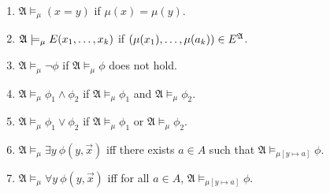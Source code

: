 \begin{samepage}
\begin{enumerate}
%
%
%
\item   $\mathfrak{A} \models_\mu (x = y)$ if 
$ \mu(x) = \mu(y)$.
%
\item  $\mathfrak{A} \models_\mu E(x_1 , \ldots , x_k ) $ if
$ (\mu(x_1), \ldots, \mu(a_k))
\in E^{\mathfrak{A}} $.
%
%
\item   $\mathfrak{A} \models_\mu \neg \phi$ if 
$\mathfrak{A} \models_\mu \phi $ does not hold.
%
\item   $\mathfrak{A} \models_\mu \phi_1 \wedge \phi_2$ if
$\mathfrak{A} \models_\mu \phi_1$ and 
$\mathfrak{A} \models_\mu \phi_2$.
%
\item   $\mathfrak{A} \models_\mu \phi_1 \vee \phi_2$ if
$\mathfrak{A} \models_\mu \phi_1$ or 
$\mathfrak{A} \models_\mu \phi_2$.
%
%
\item   %
$\mathfrak{A} \models_\mu \exists y ~ \phi   (y, \overrightarrow{x} %
)$ iff
there exists
$a \in A$
such that
$\mathfrak{A} \models_{\mu[y \mapsto a]} \phi$.
%
\item    %
$\mathfrak{A} \models_\mu \forall y ~ \phi   (y, \overrightarrow{x}%
)$ iff
for all
$a \in A$,
$\mathfrak{A} \models_{\mu[y \mapsto a]} \phi$.
%
%
\end{enumerate}
\end{samepage}








